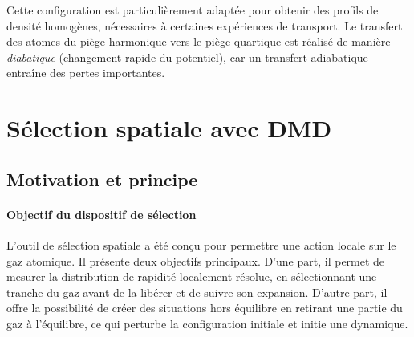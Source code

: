 \medskip

Cette configuration est particulièrement adaptée pour obtenir des profils de densité homogènes, nécessaires à certaines expériences de transport. Le transfert des atomes du piège harmonique vers le piège quartique est réalisé de manière \emph{diabatique} (changement rapide du potentiel), car un transfert adiabatique entraîne des pertes importantes.




\section{Sélection spatiale avec DMD}
\subsection{Motivation et principe}

\paragraph{Objectif du dispositif de sélection}

L’outil de sélection spatiale a été conçu pour permettre une action locale sur le gaz atomique. Il présente deux objectifs principaux. D’une part, il permet de mesurer la distribution de rapidité localement résolue, en sélectionnant une tranche du gaz avant de la libérer et de suivre son expansion. D’autre part, il offre la possibilité de créer des situations hors équilibre en retirant une partie du gaz à l’équilibre, ce qui perturbe la configuration initiale et initie une dynamique.

